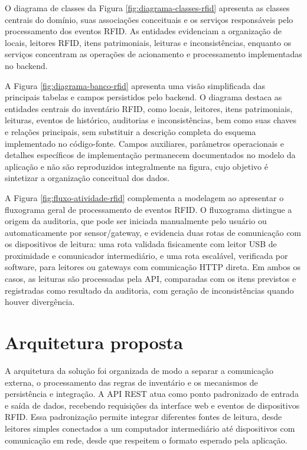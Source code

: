 

O diagrama de classes da Figura \ref{fig:diagrama-classes-rfid} apresenta as classes centrais do domínio, suas associações conceituais e os serviços responsáveis pelo processamento dos eventos RFID. As entidades evidenciam a organização de locais, leitores RFID, itens patrimoniais, leituras e inconsistências, enquanto os serviços concentram as operações de acionamento e processamento implementadas no backend.



A Figura \ref{fig:diagrama-banco-rfid} apresenta uma visão simplificada das principais tabelas e campos persistidos pelo backend. O diagrama destaca as entidades centrais do invent\'ario RFID, como locais, leitores, itens patrimoniais, leituras, eventos de hist\'orico, auditorias e inconsist\^encias, bem como suas chaves e rela\c{c}\~oes principais, sem substituir a descrição completa do esquema implementado no código-fonte. Campos auxiliares, parâmetros operacionais e detalhes específicos de implementação permanecem documentados no modelo da aplicação e não são reproduzidos integralmente na figura, cujo objetivo é sintetizar a organização conceitual dos dados.



A Figura \ref{fig:fluxo-atividade-rfid} complementa a modelagem ao apresentar o fluxograma geral de processamento de eventos RFID. O fluxograma distingue a origem da auditoria, que pode ser iniciada manualmente pelo usuário ou automaticamente por sensor/gateway, e evidencia duas rotas de comunicação com os dispositivos de leitura: uma rota validada fisicamente com leitor USB de proximidade e comunicador intermediário, e uma rota escalável, verificada por software, para leitores ou gateways com comunicação HTTP direta. Em ambos os casos, as leituras são processadas pela API, comparadas com os itens previstos e registradas como resultado da auditoria, com geração de inconsistências quando houver divergência.



\section{Arquitetura proposta}

A arquitetura da solução foi organizada de modo a separar a comunicação externa, o processamento das regras de inventário e os mecanismos de persistência e integração. A API REST atua como ponto padronizado de entrada e saída de dados, recebendo requisições da interface web e eventos de dispositivos RFID. Essa padronização permite integrar diferentes fontes de leitura, desde leitores simples conectados a um computador intermediário até dispositivos com comunicação em rede, desde que respeitem o formato esperado pela aplicação.

